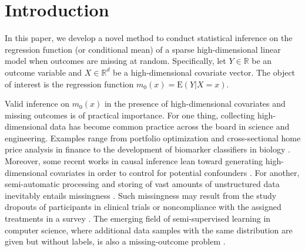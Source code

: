 \documentclass[ejsv2,noshowframe]{imsart}
\theoremstyle{plain}
\theoremstyle{definition}
\theoremstyle{remark}
\begin{document}
\begin{frontmatter}
\begin{keyword}[class=MSC2020]
\end{keyword}

\begin{keyword}
\end{keyword}

\end{frontmatter}
\tableofcontents


\section{Introduction}
\label{sec:Intro}

In this paper, we develop a novel method to conduct statistical inference on the regression function (or conditional mean) of a sparse high-dimensional linear model when outcomes are missing at random. Specifically, let $Y \in \mathbb{R}$ be an outcome variable and $X \in \mathbb{R}^d$ be a high-dimensional covariate vector. The object of interest is the regression function $m_0(x)=\mathrm{E}(Y|X=x)$.

Valid inference on $m_0(x)$ in the presence of high-dimensional covariates and missing outcomes is of practical importance. For one thing, collecting high-dimensional data has become common practice across the board in science and engineering. Examples range from portfolio optimization and cross-sectional home price analysis in finance \citep{fan2011sparse} to the development of biomarker classifiers in biology \citep{baek2009development}. Moreover, some recent works in causal inference lean toward generating high-dimensional covariates in order to control for potential confounders \citep{wyss2022machine}.
For another, semi-automatic processing and storing of vast amounts of unstructured data inevitably entails missingness \citep{huang2016unforeseen}. Such missingness may result from the study dropouts of participants in clinical trials \citep{higgins2008imputation} or noncompliance with the assigned treatments in a survey \citep{frumento2012evaluating}. The emerging field of semi-supervised learning in computer science, where additional data samples with the same distribution are given but without labels, is also a missing-outcome problem \citep{oliver2006semi}.
\end{document}
